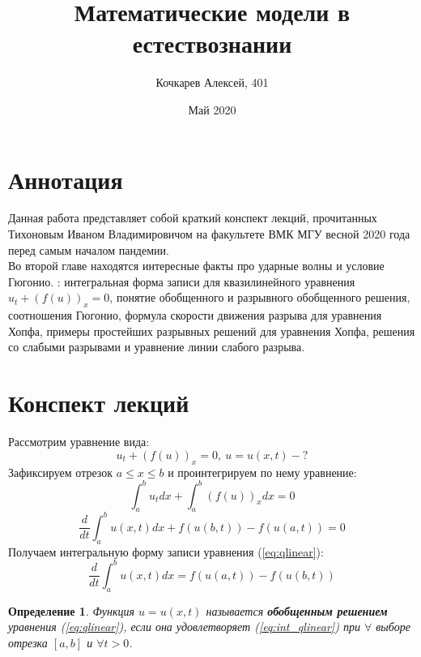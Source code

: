 \documentclass[14pt]{article}
\title{Математические модели в естествознании}
\author{Кочкарев Алексей, 401}
\date{Май 2020}
\newtheorem{definition}{Определение}
\begin{document}
\maketitle

\section*{Аннотация}
Данная работа представляет собой краткий конспект лекций, прочитанных Тихоновым Иваном Владимировичом на факультете ВМК МГУ весной 2020 года перед самым началом пандемии. \\ Во второй главе находятся интересные факты про ударные волны и условие Гюгонио.
: 
интегральная форма записи для квазилинейного уравнения \\ $u_{t}+(f(u))_{x}=0$,
понятие обобщенного и разрывного обобщенного решения, соотношения Гюгонио, формула скорости движения разрыва для уравнения Хопфа, примеры простейших разрывных решений для уравнения Хопфа, решения со слабыми
разрывами и уравнение линии слабого разрыва.

\section{Конспект лекций}
Рассмотрим уравнение вида: 
\begin{equation}\label{eq:qlinear}
    u_{t}+(f(u))_{x}=0, \ u=u(x,t) - ?
\end{equation}
Зафиксируем отрезок $a\leq x \leq b$ и проинтегрируем по нему уравнение:
$$\int_{a}^{b} u_{t} dx + \int_{a}^{b}(f(u))_{x} dx = 0$$
$$ \frac{d}{dt} \int_{a}^{b} u(x,t)dx + f(u(b,t)) - f(u(a,t))=0 $$
Получаем интегральную форму записи уравнения (\ref{eq:qlinear}):
\begin{equation}\label{eq:int_qlinear}
    \frac{d}{dt} \int_{a}^{b} u(x,t)dx = f(u(a,t))-f(u(b,t))
\end{equation}

\theoremstyle{definition}
\begin{definition}
    Функция $u=u(x,t)$ называется \textbf{обобщенным решением} уравнения (\ref{eq:qlinear}), если она удовлетворяет (\ref{eq:int_qlinear}) при $\forall$ выборе отрезка $[a,b]$ и $\forall t > 0$.
\end{definition}
\end{document}
